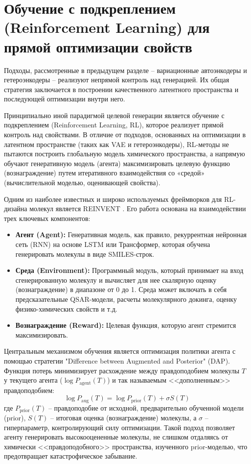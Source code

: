 

\section{Обучение с подкреплением (Reinforcement Learning) для прямой оптимизации свойств}

Подходы, рассмотренные в предыдущем разделе -- вариационные автоэнкодеры и гетероэнкодеры -- реализуют непрямой контроль над генерацией. Их общая стратегия заключается в построении качественного латентного пространства и последующей оптимизации внутри него.

Принципиально иной парадигмой целевой генерации является обучение с подкреплением (Reinforcement Learning, RL), которое реализует прямой контроль над свойствами. В отличие от подходов, основанных на оптимизации в латентном пространстве (таких как VAE и гетероэнкодеры), RL-методы не пытаются построить глобальную модель химического пространства, а напрямую обучают генеративную модель (агента) максимизировать целевую функцию (вознаграждение) путем итеративного взаимодействия со «средой» (вычислительной моделью, оценивающей свойства).


Одним из наиболее известных и широко используемых фреймворков для RL-дизайна молекул является REINVENT \cite{loeffler2024reinvent}. Его работа основана на взаимодействии трех ключевых компонентов:
\begin{itemize}
    \item \textbf{Агент (Agent):} Генеративная модель, как правило, рекуррентная нейронная сеть (RNN) на основе LSTM или Трансформер, которая обучена генерировать молекулы в виде SMILES-строк.
    \item \textbf{Среда (Environment):} Программный модуль, который принимает на вход сгенерированную молекулу и вычисляет для нее скалярную оценку (вознаграждение) в диапазоне от 0 до 1. Среда может включать в себя предсказательные QSAR-модели, расчеты молекулярного докинга, оценку физико-химических свойств и т.д.
    \item \textbf{Вознаграждение (Reward):} Целевая функция, которую агент стремится максимизировать.
\end{itemize}
Центральным механизмом обучения является оптимизация политики агента с помощью стратегии "Difference between Augmented and Posterior" (DAP). Функция потерь минимизирует расхождение между правдоподобием молекулы $T$ у текущего агента ($\log P_{\text{agent}}(T)$) и так называемым <<дополненным>> правдоподобием:
$$ \log P_{\text{aug}}(T) = \log P_{\text{prior}}(T) + \sigma S(T) $$
где $P_{\text{prior}}(T)$ -- правдоподобие от исходной, предварительно обученной модели (prior), $S(T)$ -- итоговая оценка (вознаграждение) молекулы, а $\sigma$ -- гиперпараметр, контролирующий силу оптимизации. Такой подход позволяет агенту генерировать высокооцененные молекулы, не слишком отдаляясь от химически <<правдоподобного>> пространства, изученного prior-моделью, что предотвращает катастрофическое забывание.

